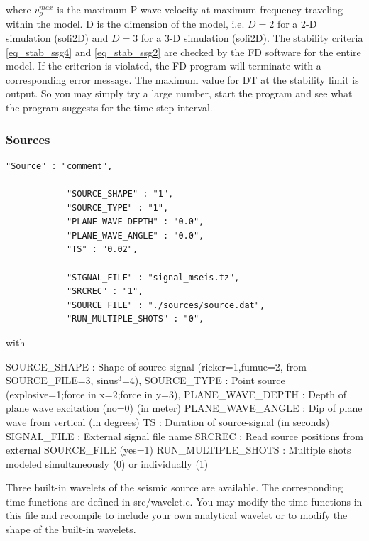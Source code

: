 \documentclass[11pt,onecolumn,oneside]{article}
\begin{document}
where $v_p^{max}$ is the maximum P-wave velocity at maximum frequency traveling within  the model. D is the dimension of the model, i.e. $D=2$ for a 2-D simulation (sofi2D) and $D=3$ for a 3-D simulation (sofi2D). The stability criteria \ref{eq_stab_ssg4} and \ref{eq_stab_ssg2} are checked by the FD software for the entire model. If the criterion is violated, the FD program will terminate with a corresponding error message. The maximum value for DT at the stability  limit is output. So you may simply try a large number, start the program and see what the program suggests for the time step interval.

\subsubsection{Sources}
\label{sources}
\begin{verbatim}
"Source" : "comment",

			"SOURCE_SHAPE" : "1",
			"SOURCE_TYPE" : "1",
			"PLANE_WAVE_DEPTH" : "0.0",
			"PLANE_WAVE_ANGLE" : "0.0",
			"TS" : "0.02",
	
			"SIGNAL_FILE" : "signal_mseis.tz",
			"SRCREC" : "1",
			"SOURCE_FILE" : "./sources/source.dat", 
			"RUN_MULTIPLE_SHOTS" : "0",
\end{verbatim}

with

SOURCE\_SHAPE : Shape of source-signal (ricker=1,fumue=2, from SOURCE\_FILE=3, sinus$^3$=4),  \newline
SOURCE\_TYPE : Point source (explosive=1;force in x=2;force in y=3),\newline
PLANE\_WAVE\_DEPTH : Depth of plane wave excitation (no=0) (in meter)\newline
PLANE\_WAVE\_ANGLE : Dip of plane wave from vertical (in degrees)\newline
TS : Duration of source-signal (in seconds)\newline
SIGNAL\_FILE : External signal file name \newline
SRCREC : Read source positions from external SOURCE\_FILE (yes=1)\newline
RUN\_MULTIPLE\_SHOTS : Multiple shots modeled simultaneously (0) or individually (1)\newline

Three built-in wavelets of the seismic source are available. The corresponding time functions are defined in src/wavelet.c. You may modify the time functions in this file and recompile to include your own analytical wavelet or to modify the shape of the built-in wavelets.
\end{document}
